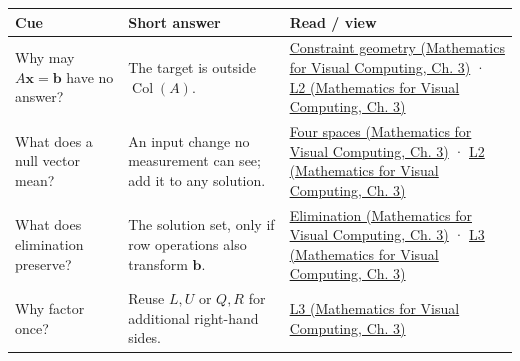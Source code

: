{\def\LTcaptype{none} %
\begin{longtable}[]{@{}
  >{\raggedright\arraybackslash}p{}
  >{\raggedright\arraybackslash}p{}
  >{\raggedright\arraybackslash}p{}@{}}
\toprule\noalign{}
\begin{minipage}[b]{\linewidth}\raggedright
Cue
\end{minipage} & \begin{minipage}[b]{\linewidth}\raggedright
Short answer
\end{minipage} & \begin{minipage}[b]{\linewidth}\raggedright
Read / view
\end{minipage} \\
\midrule\noalign{}
\endhead
\bottomrule\noalign{}
\endlastfoot
Why may \(A\mathbf x=\mathbf b\) have no answer? & The target is outside \(\operatorname{Col}(A)\). & \href{../02-Mathematics-for-Visual-Computing/main.pdf\#nameddest=01-foundations-i-ch019-a-linear-equation-is-a-measurement-and-several-equations-are-geometry}{Constraint geometry (Mathematics for Visual Computing, Ch. 3)} · \href{../02-Mathematics-for-Visual-Computing/main.pdf\#nameddest=01-foundations-i-ch019-figure-l2---consistency-freedom-and-the-four-fundamental-spaces}{L2 (Mathematics for Visual Computing, Ch. 3)} \\
What does a null vector mean? & An input change no measurement can see; add it to any solution. & \href{../02-Mathematics-for-Visual-Computing/main.pdf\#nameddest=01-foundations-i-ch019-rank-separates-what-the-measurements-determine-from-what-they-leave-free}{Four spaces (Mathematics for Visual Computing, Ch. 3)} · \href{../02-Mathematics-for-Visual-Computing/main.pdf\#nameddest=01-foundations-i-ch019-figure-l2---consistency-freedom-and-the-four-fundamental-spaces}{L2 (Mathematics for Visual Computing, Ch. 3)} \\
What does elimination preserve? & The solution set, only if row operations also transform \(\mathbf b\). & \href{../02-Mathematics-for-Visual-Computing/main.pdf\#nameddest=01-foundations-i-ch019-elimination-turns-the-geometry-into-an-auditable-calculation}{Elimination (Mathematics for Visual Computing, Ch. 3)} · \href{../02-Mathematics-for-Visual-Computing/main.pdf\#nameddest=01-foundations-i-ch019-figure-l3---elimination-stores-work-for-later-solves}{L3 (Mathematics for Visual Computing, Ch. 3)} \\
Why factor once? & Reuse \(L,U\) or \(Q,R\) for additional right-hand sides. & \href{../02-Mathematics-for-Visual-Computing/main.pdf\#nameddest=01-foundations-i-ch019-figure-l3---elimination-stores-work-for-later-solves}{L3 (Mathematics for Visual Computing, Ch. 3)} \\

\end{longtable}}
